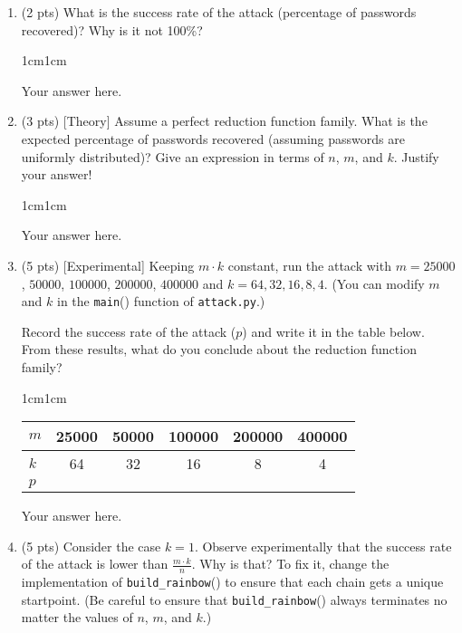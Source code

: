 \documentclass[11pt,letterpaper]{article}
\newenvironment{answer}{\em \color{blue} \begin{adjustwidth}{1cm}{1cm}}{\end{adjustwidth}}
\begin{document}
\begin{enumerate}
	\item (2 pts) What is the success rate of the attack (percentage of passwords recovered)? Why is it not 100\%?
	
	\begin{answer}
	
		Your answer here.
		
	\end{answer}
	
	\item (3 pts) [Theory] Assume a perfect reduction function family. What is the expected percentage of passwords recovered (assuming passwords are uniformly distributed)? Give an expression in terms of $n$, $m$, and $k$. Justify your answer!
	
	\begin{answer}
	
		Your answer here.
		
	\end{answer}
	
	\item (5 pts) [Experimental] Keeping $m \cdot k$ constant, run the attack with $m = 25000$, $50000$, $100000$, $200000$, $400000$ and $k = 64, 32, 16, 8, 4$. (You can modify $m$ and $k$ in the \texttt{main}() function of \texttt{attack.py}.) 
	
	Record the success rate of the attack ($p$) and write it in the table below. From these results, what do you conclude about the reduction function family?
	
	\begin{answer}
	
		\begin{center}
			\begin{tabular}{l|c|c|c|c|c|}
				\hline
				$m$ & 25000 & 50000 & 100000 & 200000 & 400000 \\ \hline
				$k$ & 64 & 32    & 16      & 8      & 4      \\ \hline \hline
				$p$ &  &   &    &   &     \\ \hline
			\end{tabular}	
		\end{center}	
		
		Your answer here.
		
	\end{answer}
	
	\item (5 pts) Consider the case $k=1$. Observe experimentally that the success rate of the attack is lower than $\frac{m \cdot k}{n}$. Why is that?  To fix it, change the implementation of \texttt{build\_rainbow}() to ensure that each chain gets a unique startpoint. (Be careful to ensure that \texttt{build\_rainbow}() always terminates no matter the values of $n$, $m$, and $k$.)
	

\end{enumerate}
\end{document}
